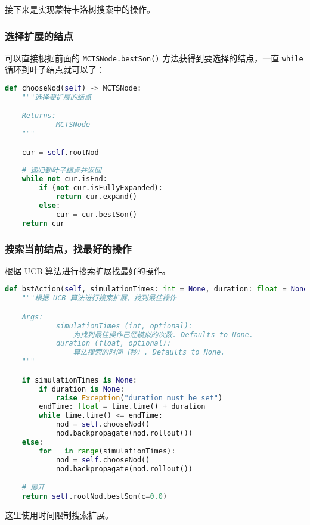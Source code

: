 接下来是实现蒙特卡洛树搜索中的操作。
\subsubsection{选择扩展的结点}
可以直接根据前面的 \verb`MCTSNode.bestSon()` 方法获得到要选择的结点，一直 \verb`while` 循环到叶子结点就可以了：
\begin{lstlisting}[language=python]
def chooseNod(self) -> MCTSNode:
    """选择要扩展的结点

    Returns:
            MCTSNode
    """

    cur = self.rootNod
    
    # 递归到叶子结点并返回
    while not cur.isEnd:
        if (not cur.isFullyExpanded):
            return cur.expand()
        else:
            cur = cur.bestSon()
    return cur
\end{lstlisting}

\subsubsection{搜索当前结点，找最好的操作}
根据 UCB 算法进行搜索扩展找最好的操作。
\begin{lstlisting}[language=python]
def bstAction(self, simulationTimes: int = None, duration: float = None):
    """根据 UCB 算法进行搜索扩展，找到最佳操作

    Args:
            simulationTimes (int, optional): 
                为找到最佳操作已经模拟的次数. Defaults to None.
            duration (float, optional): 
                算法搜索的时间（秒）. Defaults to None.
    """

    if simulationTimes is None:
        if duration is None:
            raise Exception("duration must be set")
        endTime: float = time.time() + duration
        while time.time() <= endTime:
            nod = self.chooseNod()
            nod.backpropagate(nod.rollout())
    else:
        for _ in range(simulationTimes):
            nod = self.chooseNod()
            nod.backpropagate(nod.rollout())

    # 展开
    return self.rootNod.bestSon(c=0.0)
\end{lstlisting}
这里使用时间限制搜索扩展。

